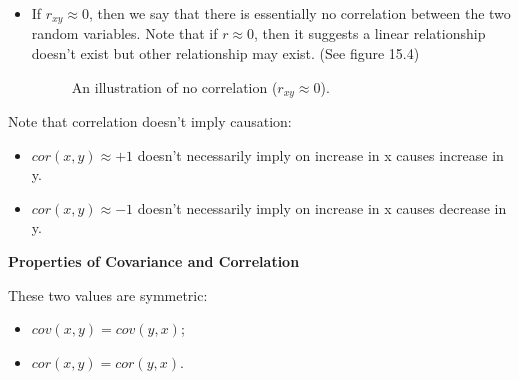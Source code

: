 \begin{itemize}
	\item If $r_{xy} \approx 0$, then we say that there is essentially no correlation between the two random variables. Note that if $r \approx 0$, then it suggests a linear relationship doesn't exist but other relationship may exist. (See figure 15.4)
\begin{figure}[h!]
\centering
{}
\caption{An illustration of no correlation ($r_{xy} \approx 0$).}
\end{figure}
\end{itemize}

Note that correlation doesn't imply causation:

\begin{itemize}
	\item $cor(x,y) \approx +1$ doesn't necessarily imply on increase in x causes increase in y.
	\item $cor(x,y) \approx -1$ doesn't necessarily imply on increase in x causes decrease in y.
\end{itemize}

\textbf{Properties of Covariance and Correlation}

These two values are symmetric:

\begin{itemize}
	\item $cov(x,y) = cov(y,x)$;
	\item $cor(x,y) = cor(y,x)$.
\end{itemize}

